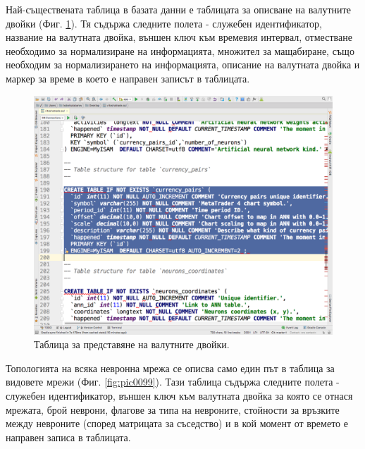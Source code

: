 \documentclass[book,14pt,oneside,openany]{memoir}
\begin{document}
Най-съществената таблица в базата данни е таблицата за описване на валутните двойки (Фиг. \ref{fig:pic0098}). Тя съдържа следните полета - служебен идентификатор, название на валутната двойка, външен ключ към времевия интервал, отместване необходимо за нормализиране на информацията, множител за мащабиране, също необходим за нормализирането на информацията, описание на валутната двойка и маркер за време в което е направен записът в таблицата. 

\begin{figure}[h]
  \centering
  \includegraphics[height=0.45\pdfpageheight]{pic0098}
  \caption{Таблица за представяне на валутните двойки.}
\label{fig:pic0098}
\end{figure}
\FloatBarrier

Топологията на всяка невронна мрежа се описва само един път в таблица за видовете мрежи (Фиг. \ref{fig:pic0099}). Тази таблица съдържа следните полета - служебен идентификатор, външен ключ към валутната двойка за която се отнася мрежата, брой неврони, флагове за типа на невроните, стойности за връзките между невроните (според матрицата за съседство) и в кой момент от времето е направен записа в таблицата. 
\end{document}
